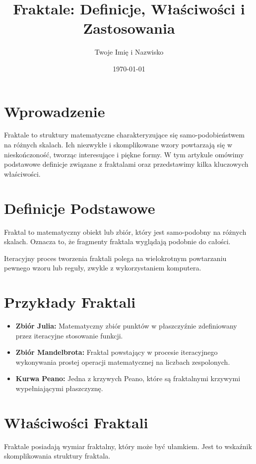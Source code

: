 \documentclass[12pt]{article}
\title{Fraktale: Definicje, Właściwości i Zastosowania}
\author{Twoje Imię i Nazwisko}
\date{\today}
\begin{document}
\maketitle

\section{Wprowadzenie}
Fraktale to struktury matematyczne charakteryzujące się samo-podobieństwem na różnych skalach. Ich niezwykłe i skomplikowane wzory powtarzają się w nieskończoność, tworząc interesujące i piękne formy. W tym artykule omówimy podstawowe definicje związane z fraktalami oraz przedstawimy kilka kluczowych właściwości.

\section{Definicje Podstawowe}
\begin{definition}
Fraktal to matematyczny obiekt lub zbiór, który jest samo-podobny na różnych skalach. Oznacza to, że fragmenty fraktala wyglądają podobnie do całości.
\end{definition}

\begin{definition}
Iteracyjny proces tworzenia fraktali polega na wielokrotnym powtarzaniu pewnego wzoru lub reguły, zwykle z wykorzystaniem komputera.
\end{definition}

\section{Przykłady Fraktali}
\begin{itemize}
  \item \textbf{Zbiór Julia:} Matematyczny zbiór punktów w płaszczyźnie zdefiniowany przez iteracyjne stosowanie funkcji.
  \item \textbf{Zbiór Mandelbrota:} Fraktal powstający w procesie iteracyjnego wykonywania prostej operacji matematycznej na liczbach zespolonych.
  \item \textbf{Kurwa Peano:} Jedna z krzywych Peano, które są fraktalnymi krzywymi wypełniającymi płaszczyznę.
\end{itemize}

\section{Właściwości Fraktali}
\begin{theorem}
Fraktale posiadają wymiar fraktalny, który może być ułamkiem. Jest to wskaźnik skomplikowania struktury fraktala.
\end{theorem}
\end{document}
